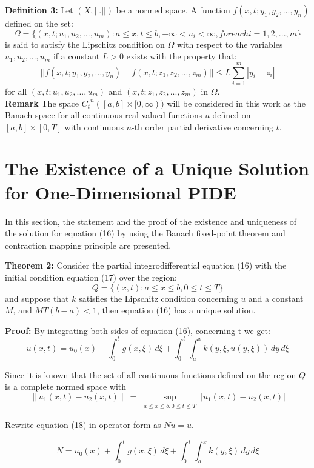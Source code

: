 \documentclass[12pt, a4paper]{report}
\begin{document}
\textbf{Definition 3:}
Let \( (X, ||.||) \) be a normed space. A function \( f(x,t;y_1,y_2,...,y_n) \) defined on the set:
\[ \Omega = \{(x,t;u_1,u_2,...,u_m) : a \leq x, t \leq b, -\infty < u_i < \infty, for each  i = 1,2,...,m\} \]
is said to satisfy the Lipschitz condition on \( \Omega \) with respect to the variables \( u_1, u_2,..., u_m \) if a constant \( L > 0 \) exists with the property that:
\[ || f(x,t;y_1,y_2,...,y_n) - f(x,t;z_1,z_2,...,z_m) || \leq L \sum_{i=1}^{m} |y_i - z_i| \]
for all \( (x,t;u_1,u_2,...,u_m) \) and \( (x,t;z_1,z_2,...,z_m) \) in \( \Omega \).\\
\textbf{Remark}
The space \( {C_t}^n ([a,b] \times [0,\infty)) \) will be considered in this work as the Banach space for all continuous real-valued functions \( u \) defined on \( [a,b] \times [0, T] \) with continuous \( n \)-th order partial derivative concerning \( t \).
\clearpage

\section{The Existence of a Unique Solution for One-Dimensional PIDE}

In this section, the statement and the proof of the existence and uniqueness of the solution for equation (16) by using the Banach fixed-point theorem and contraction mapping principle are presented.

\textbf{Theorem 2:}
Consider the partial integrodifferential equation (16) with the initial condition equation (17) over the region:
\[ Q = \{(x,t) : a \leq x \leq b, 0 \leq t \leq T\} \]
and suppose that \( k \) satisfies the Lipschitz condition concerning \( u \) and a constant \( M \), and \( MT(b - a) < 1 \), then equation (16) has a unique solution.

\textbf{Proof:}
By integrating both sides of equation (16), concerning t we get:
\begin{equation}
    u(x,t) = u_0(x) + \int_{0}^{t} g(x,\xi) \, d\xi + \int_{0}^{t} \int_{a}^{x} k(y,\xi,u(y,\xi)) \, dy \, d\xi
\end{equation}

Since it is known that the set of all continuous functions defined on the region \( Q \) is a complete normed space with
\[ \| u_1(x,t) - u_2(x,t) \| = \sup_{\substack{a \leq x \leq b , 0 \leq t \leq T}} {| u_1(x,t) - u_2(x,t) |} \]

Rewrite equation (18) in operator form as \( Nu = u \).

\[ N = u_0(x) + \int_{0}^{t} g(x,\xi) \, d\xi + \int_{0}^{t} \int_{a}^{x} k(y,\xi) \, dy \, d\xi \]
\end{document}
